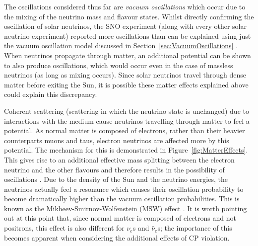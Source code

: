 The oscillations considered thus far are \textit{vacuum oscillations} which occur due to the mixing of the neutrino mass and flavour states.  Whilst directly confirming the oscillation of solar neutrinos, the SNO experiment (along with every other solar neutrino experiment) reported more oscillations than can be explained using just the vacuum oscillation model discussed in Section~\ref{sec:VacuumOscillations} \cite{Bahcall2002,Smirnov2003}.  When neutrinos propagate through matter, an additional potential can be shown to also produce oscillations, which would occur even in the case of massless neutrinos (as long as mixing occurs).  Since solar neutrinos travel through dense matter before exiting the Sun, it is possible these matter effects explained above could explain this discrepancy.

Coherent scattering (scattering in which the neutrino state is unchanged) due to interactions with the medium cause neutrinos travelling through matter to feel a potential.  As normal matter is composed of electrons, rather than their heavier counterparts muons and taus, electron neutrinos are affected more by this potential.  The mechanism for this is demonstrated in Figure~\ref{fig:MatterEffects}.  This gives rise to an additional effective mass splitting between the electron neutrino and the other flavours and therefore results in the possibility of oscillations \cite{Wolfenstein1978}.  Due to the density of the Sun and the neutrino energies, the neutrinos actually feel a resonance which causes their oscillation probability to become dramatically higher than the vacuum oscillation probabilities.  This is known as the Mikheev-Smirnov-Wolfenstein (MSW) effect \cite{MS1985,MS1986}.  It is worth pointing out at this point that, since normal matter is composed of electrons and not positrons, this effect is also different for $\nu_e$s and $\bar{\nu}_e$s; the importance of this becomes apparent when considering the additional effects of CP violation.

